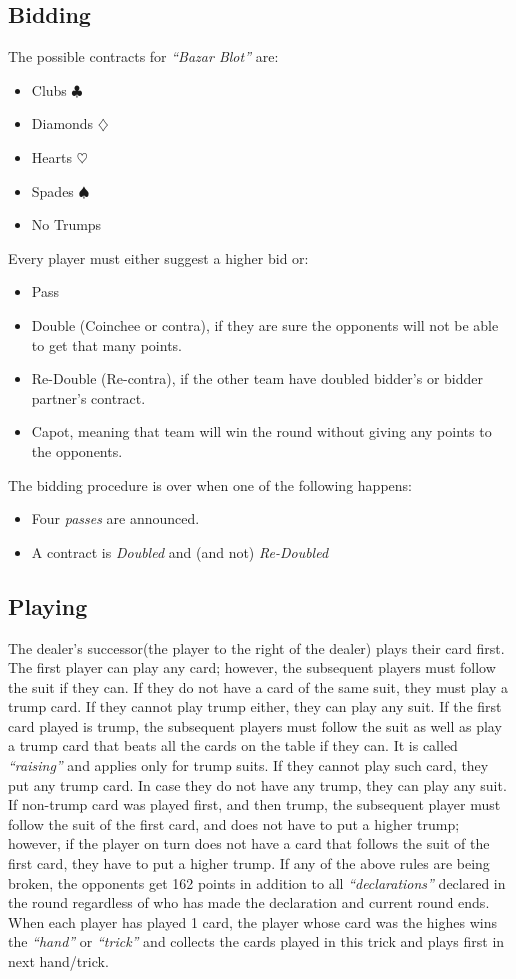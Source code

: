 \subsection{Bidding}
The possible contracts for \textit{``Bazar Blot''} are:
\begin{itemize}
    \item Clubs $\clubsuit$
    \item Diamonds $\diamondsuit$
    \item Hearts $\heartsuit$
    \item Spades $\spadesuit$
    \item No Trumps
\end{itemize}
Every player must either suggest a higher bid or:
\begin{itemize}
    \item Pass
    \item Double (Coinchee or contra), if they are sure the opponents will not be able to get that many points.
    \item Re-Double (Re-contra), if the other team have doubled bidder's or bidder partner's contract.
    \item Capot, meaning that team will win the round without giving any points to the opponents.
\end{itemize}

The bidding procedure is over when one of the following happens:
\begin{itemize}
    \item Four \textit{passes} are announced.
    \item A contract is \textit{Doubled} and (and not) \textit{Re-Doubled}
\end{itemize}

\subsection{Playing}
The dealer's successor(the player to the right of the dealer) plays their card first.
The first player can play any card; however, the subsequent players must follow the suit if they can.
If they do not have a card of the same suit, they must play a trump card.
If they cannot play trump either, they can play any suit.
If the first card played is trump, the subsequent players must follow the suit as well as play a trump card that beats all the cards on the table if they can.
It is called \textit{``raising''} and applies only for trump suits.
If they cannot play such card, they put any trump card.
In case they do not have any trump, they can play any suit.
If non-trump card was played first, and then trump, the subsequent player must follow the suit of the first card, and does not have to put a higher trump; however, if the player on turn does not have a card that follows the suit of the first card, they have to put a higher trump.
If any of the above rules are being broken, the opponents get 162 points in addition to all \textit{``declarations''} declared in the round regardless of who has made the declaration and current round ends.
When each player has played 1 card, the player whose card was the highes wins the \textit{``hand''} or \textit{``trick''} and collects the cards played in this trick and plays first in next hand/trick.

